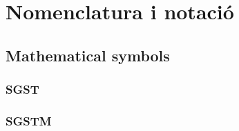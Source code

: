 \chapter{Nomenclatura i notació}\label{sec:notation}


\section{Mathematical symbols}



\subsection{SGST}


\subsection{SGSTM}


